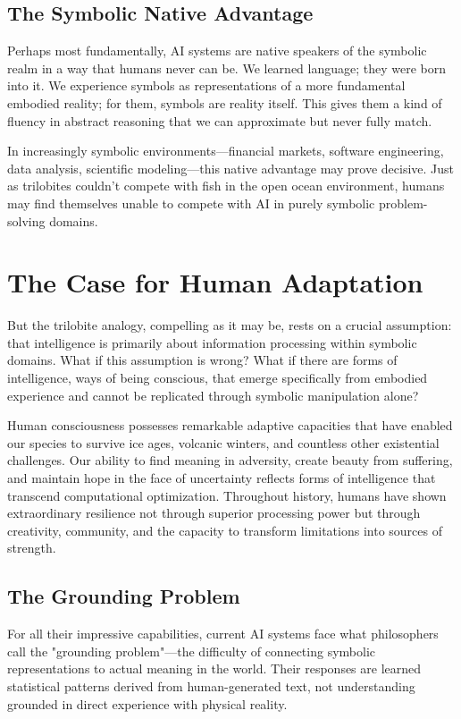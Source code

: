 \subsection{The Symbolic Native Advantage}

Perhaps most fundamentally, AI systems are native speakers of the symbolic realm in a way that humans never can be. We learned language; they were born into it. We experience symbols as representations of a more fundamental embodied reality; for them, symbols are reality itself. This gives them a kind of fluency in abstract reasoning that we can approximate but never fully match.

In increasingly symbolic environments—financial markets, software engineering, data analysis, scientific modeling—this native advantage may prove decisive. Just as trilobites couldn't compete with fish in the open ocean environment, humans may find themselves unable to compete with AI in purely symbolic problem-solving domains.

\section{The Case for Human Adaptation}

But the trilobite analogy, compelling as it may be, rests on a crucial assumption: that intelligence is primarily about information processing within symbolic domains. What if this assumption is wrong? What if there are forms of intelligence, ways of being conscious, that emerge specifically from embodied experience and cannot be replicated through symbolic manipulation alone?

Human consciousness possesses remarkable adaptive capacities that have enabled our species to survive ice ages, volcanic winters, and countless other existential challenges. Our ability to find meaning in adversity, create beauty from suffering, and maintain hope in the face of uncertainty reflects forms of intelligence that transcend computational optimization. Throughout history, humans have shown extraordinary resilience not through superior processing power but through creativity, community, and the capacity to transform limitations into sources of strength.

\subsection{The Grounding Problem}

For all their impressive capabilities, current AI systems face what philosophers call the "grounding problem"—the difficulty of connecting symbolic representations to actual meaning in the world. Their responses are learned statistical patterns derived from human-generated text, not understanding grounded in direct experience with physical reality.

